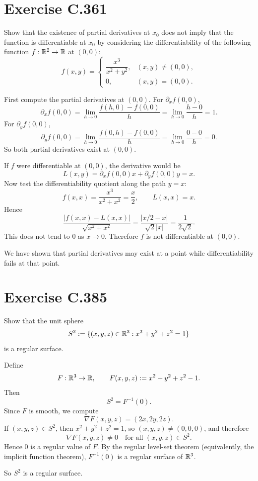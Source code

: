 \documentclass{article}
\begin{document}
\section{Exercise C.361}

Show that the existence of partial derivatives at $x_0$ does not imply
that the function is differentiable at $x_0$ by considering the
differentiability of the following function $f : \mathbb{R}^2 \to \mathbb{R}$ at
$(0,0)$:
\[
  f(x,y)=
  \begin{cases}
    \dfrac{x^3}{x^2+y^2}, & (x,y)\neq(0,0), \\
    0, & (x,y)=(0,0).
  \end{cases}
\]

\begin{solution}
  First compute the partial derivatives at $(0,0)$.
  For $\partial_x f(0,0)$,
  \[
    \partial_x f(0,0)
    = \lim_{h\to 0}\frac{f(h,0)-f(0,0)}{h}
    = \lim_{h\to 0}\frac{h-0}{h}=1.
  \]
  For $\partial_y f(0,0)$,
  \[
    \partial_y f(0,0)
    = \lim_{h\to 0}\frac{f(0,h)-f(0,0)}{h}
    = \lim_{h\to 0}\frac{0-0}{h}=0.
  \]
  So both partial derivatives exist at $(0,0)$.

  If $f$ were differentiable at $(0,0)$, the derivative would be
  \[
    L(x,y)=\partial_x f(0,0)x+\partial_y f(0,0)y=x.
  \]
  Now test the differentiability quotient along the path $y=x$:
  \[
    f(x,x)=\frac{x^3}{x^2+x^2}=\frac{x}{2},
    \qquad
    L(x,x)=x.
  \]
  Hence
  \[
    \frac{|f(x,x)-L(x,x)|}{\sqrt{x^2+x^2}}
    = \frac{|x/2-x|}{\sqrt{2}|x|}
    = \frac{1}{2\sqrt{2}}.
  \]
  This does not tend to $0$ as $x\to 0$. Therefore $f$ is not
  differentiable at $(0,0)$.

  We have shown that partial derivatives may exist at a point while
  differentiability fails at that point.
\end{solution}

\section{Exercise C.385}

Show that the unit sphere
\[
  S^2 := \{(x,y,z)\in\mathbb{R}^3 : x^2+y^2+z^2=1\}
\]
is a regular surface.

\begin{solution}
  Define
  \[
    F:\mathbb{R}^3\to\mathbb{R}, \qquad F(x,y,z):=x^2+y^2+z^2-1.
  \]
  Then
  \[
    S^2 = F^{-1}(0).
  \]
  Since $F$ is smooth, we compute
  \[
    \nabla F(x,y,z)=(2x,2y,2z).
  \]
  If $(x,y,z)\in S^2$, then $x^2+y^2+z^2=1$, so $(x,y,z)\neq(0,0,0)$, and
  therefore
  \[
    \nabla F(x,y,z)\neq 0 \quad \text{for all } (x,y,z)\in S^2.
  \]
  Hence $0$ is a regular value of $F$. By the regular level-set theorem
  (equivalently, the implicit function theorem), $F^{-1}(0)$ is a regular
  surface of $\mathbb{R}^3$.

  So $S^2$ is a regular surface.
\end{solution}
\end{document}
